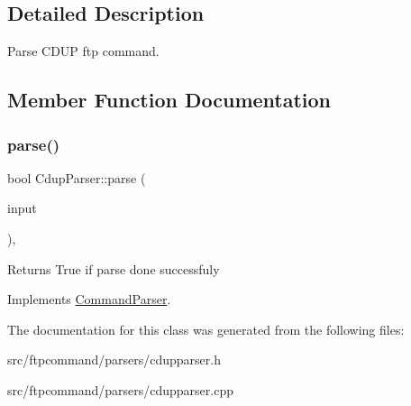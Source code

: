 \subsection{Detailed Description}
Parse C\+D\+UP ftp command. 

\subsection{Member Function Documentation}
\mbox{\label{classCdupParser_abfd60eab9d76c34867434b8a36289701}} 
\subsubsection{\texorpdfstring{parse()}{parse()}}
{\footnotesize\ttfamily bool Cdup\+Parser\+::parse (\begin{DoxyParamCaption}\item[{const Q\+String \&}]{input }\end{DoxyParamCaption})\hspace{0.3cm}{\ttfamily [override]}, {\ttfamily [virtual]}}

\begin{DoxyReturn}{Returns}
True if parse done successfuly 
\end{DoxyReturn}


Implements \hyperlink{classCommandParser_a5ed0855947a9b4500329f29b8123f2ea}{Command\+Parser}.



The documentation for this class was generated from the following files\+:\begin{DoxyCompactItemize}
\item 
src/ftpcommand/parsers/cdupparser.\+h\item 
src/ftpcommand/parsers/cdupparser.\+cpp\end{DoxyCompactItemize}
